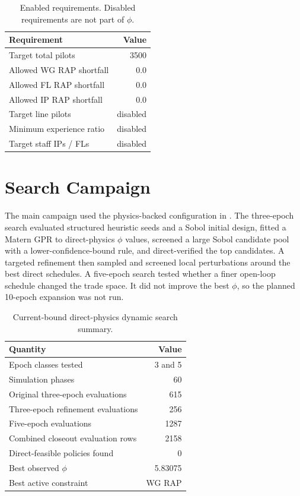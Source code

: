 \documentclass[10pt]{article}
\begin{document}
\begin{table}[htbp]
\centering
\caption{Enabled requirements. Disabled requirements are not part of $\phi$.}
\label{tab:requirements}
\begin{tabular}{lr}
\toprule
Requirement & Value \\
\midrule
Target total pilots & 3500 \\
Allowed WG RAP shortfall & 0.0 \\
Allowed FL RAP shortfall & 0.0 \\
Allowed IP RAP shortfall & 0.0 \\
Target line pilots & disabled \\
Minimum experience ratio & disabled \\
Target staff IPs / FLs & disabled \\
\bottomrule
\end{tabular}
\end{table}

\FloatBarrier

\section{Search Campaign}

The main campaign used the physics-backed configuration in
. The
three-epoch search evaluated structured heuristic seeds and a Sobol initial
design, fitted a Matern GPR to direct-physics $\phi$ values, screened a large
Sobol candidate pool with a lower-confidence-bound rule, and direct-verified
the top candidates. A targeted refinement then sampled and screened local
perturbations around the best direct schedules. A five-epoch search tested
whether a finer open-loop schedule changed the trade space. It did not improve
the best $\phi$, so the planned 10-epoch expansion was not run.

\begin{table}[htbp]
\centering
\caption{Current-bound direct-physics dynamic search summary.}
\label{tab:search-summary}
\begin{tabular}{lr}
\toprule
Quantity & Value \\
\midrule
Epoch classes tested & 3 and 5 \\
Simulation phases & 60 \\
Original three-epoch evaluations & 615 \\
Three-epoch refinement evaluations & 256 \\
Five-epoch evaluations & 1287 \\
Combined closeout evaluation rows & 2158 \\
Direct-feasible policies found & 0 \\
Best observed $\phi$ & 5.83075 \\
Best active constraint & WG RAP \\
\bottomrule
\end{tabular}
\end{table}
\end{document}

